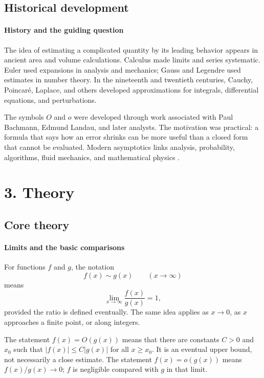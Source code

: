 \subsection*{Historical development}
\begin{historylist}
\paragraph{History and the guiding question}

The idea of estimating a complicated quantity by its leading behavior appears in ancient area and volume calculations. Calculus made limits and series systematic. Euler used expansions in analysis and mechanics; Gauss and Legendre used estimates in number theory. In the nineteenth and twentieth centuries, Cauchy, Poincaré, Laplace, and others developed approximations for integrals, differential equations, and perturbations.

The symbols $O$ and $o$ were developed through work associated with Paul Bachmann, Edmund Landau, and later analysts. The motivation was practical: a formula that says how an error shrinks can be more useful than a closed form that cannot be evaluated. Modern asymptotics links analysis, probability, algorithms, fluid mechanics, and mathematical physics \cite{asymptotic_theory_ref1,asymptotic_theory_ref3}.

\end{historylist}
\section*{3. Theory}
\subsection*{Core theory}
\paragraph{Limits and the basic comparisons}

For functions $f$ and $g$, the notation
\[
 f(x)\sim g(x)\qquad (x\to\infty)
\]
means
\[
 \lim_{x\to\infty}\frac{f(x)}{g(x)}=1,
\]
provided the ratio is defined eventually. The same idea applies as $x\to0$, as $x$ approaches a finite point, or along integers.

The statement $f(x)=O(g(x))$ means that there are constants $C>0$ and $x_0$ such that $|f(x)|\leq C|g(x)|$ for all $x\geq x_0$. It is an eventual upper bound, not necessarily a close estimate. The statement $f(x)=o(g(x))$ means $f(x)/g(x)\to0$; $f$ is negligible compared with $g$ in that limit.

